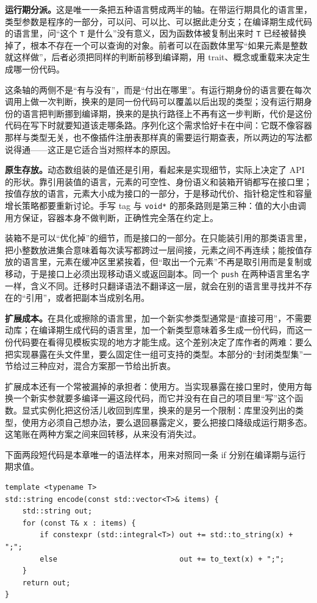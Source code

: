 \documentclass[12pt,a4paper,fontset=fandol]{ctexbook}
\newcommand{\kw}[1]{\texttt{#1}}
\begin{document}
\textbf{运行期分派。}这是唯一一条把五种语言劈成两半的轴。在带运行期具化的语言里，类型参数是程序的一部分，可以问、可以比、可以据此走分支；在编译期生成代码的语言里，问“这个 \kw{T} 是什么”没有意义，因为函数体被复制出来时 \kw{T} 已经被替换掉了，根本不存在一个可以查询的对象。前者可以在函数体里写“如果元素是整数就这样做”，后者必须把同样的判断前移到编译期，用 trait、概念或重载来决定生成哪一份代码。

这条轴的两侧不是“有与没有”，而是“付出在哪里”。有运行期身份的语言要在每次调用上做一次判断，换来的是同一份代码可以覆盖以后出现的类型；没有运行期身份的语言把判断挪到编译期，换来的是执行路径上不再有这一步判断，代价是这份代码在写下时就要知道该走哪条路。序列化这个需求恰好卡在中间：它既不像容器那样与类型无关，也不像插件注册表那样真的需要运行期查表，所以两边的写法都说得通——这正是它适合当对照样本的原因。

\textbf{原生存放。}动态数组装的是值还是引用，看起来是实现细节，实际上决定了 API 的形状。靠引用装值的语言，元素的可空性、身份语义和装箱开销都写在接口里；按值存放的语言，元素大小成为接口的一部分，于是移动代价、指针稳定性和容量增长策略都要重新讨论。手写 tag 与 \kw{void*} 的那条路则是第三种：值的大小由调用方保证，容器本身不做判断，正确性完全落在约定上。

装箱不是可以“优化掉”的细节，而是接口的一部分。在只能装引用的那类语言里，把小整数放进集合意味着每次读写都跨过一层间接，元素之间不再连续；能按值存放的语言里，元素在缓冲区里紧挨着，但“取出一个元素”不再是取引用而是复制或移动，于是接口上必须出现移动语义或返回副本。同一个 \kw{push} 在两种语言里名字一样，含义不同。迁移时只翻译语法不翻译这一层，就会在别的语言里寻找并不存在的“引用”，或者把副本当成别名用。

\textbf{扩展成本。}在具化或擦除的语言里，加一个新实参类型通常是“直接可用”，不需要动库；在编译期生成代码的语言里，加一个新类型意味着多生成一份代码，而这一份代码要在看得见模板实现的地方才能生成。这个差别决定了库作者的两难：要么把实现暴露在头文件里，要么固定住一组可支持的类型。本部分的“封闭类型集”一节给过三种应对，混合方案那一节给出折衷。

扩展成本还有一个常被漏掉的承担者：使用方。当实现暴露在接口里时，使用方每换一个新实参就要多编译一遍这段代码，而它并没有在自己的项目里“写”这个函数。显式实例化把这份活儿收回到库里，换来的是另一个限制：库里没列出的类型，使用方必须自己想办法，要么退回暴露定义，要么把接口降级成运行期多态。这笔账在两种方案之间来回转移，从来没有消失过。

下面两段短代码是本章唯一的语法样本，用来对照同一条 if 分别在编译期与运行期求值。

\begin{lstlisting}[style=cppstyle,caption={C++：分派由 trait 在编译期决定，未选中的分支不会实例化}]
template <typename T>
std::string encode(const std::vector<T>& items) {
    std::string out;
    for (const T& x : items) {
        if constexpr (std::integral<T>) out += std::to_string(x) + ";";
        else                            out += to_text(x) + ";";
    }
    return out;
}
\end{lstlisting}
\end{document}
